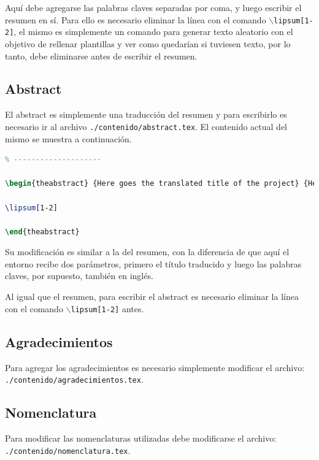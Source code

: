 Aquí debe agregarse las palabras claves separadas por coma, y luego escribir el resumen en sí. Para ello es necesario eliminar la línea con el comando \texttt{$\backslash$lipsum[1-2]}, el mismo es simplemente un comando para generar texto aleatorio con el objetivo de rellenar plantillas y ver como quedarían si tuviesen texto, por lo tanto, debe eliminarse antes de escribir el resumen.

\clearpage
\subsection{Abstract}

El abstract es simplemente una traducción del resumen y para escribirlo es necesario ir al archivo \texttt{./contenido/abstract.tex}. El contenido actual del mismo se muestra a continuación.
\footnotesize
\begin{lstlisting}[language=TeX]
% EL RESUMEN EN INGLES
% --------------------

\begin{theabstract} {Here goes the translated title of the project} {Here, goes, the, keywords, separated, by, commas}

\lipsum[1-2]

\end{theabstract}
\end{lstlisting}
\normalsize

Su modificación es similar a la del resumen, con la diferencia de que aquí el entorno  recibe dos parámetros, primero el título traducido y luego las palabras claves, por supuesto, también en inglés.

Al igual que el resumen, para escribir el abstract es necesario eliminar la línea con el comando \texttt{$\backslash$lipsum[1-2]} antes.

\subsection{Agradecimientos}

Para agregar los agradecimientos es necesario simplemente modificar el archivo: \\ \texttt{./contenido/agradecimientos.tex}.

\subsection{Nomenclatura}

Para modificar las nomenclaturas utilizadas debe modificarse el archivo: \\ \texttt{./contenido/nomenclatura.tex}.

